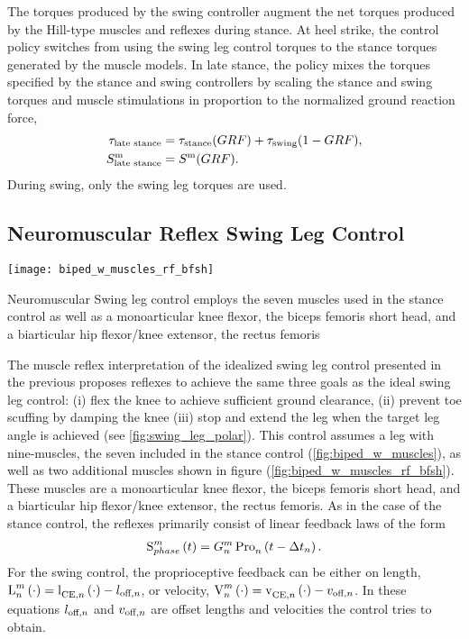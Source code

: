 The torques produced by the swing controller augment the net torques produced by
the Hill-type muscles and reflexes during stance. At heel strike, the control
policy switches from using the swing leg control torques to the stance torques
generated by the muscle models. In late stance, the policy mixes the torques
specified by the stance and swing controllers by scaling the stance and swing
torques and muscle stimulations in proportion to the normalized ground reaction
force,
\begin{align}
    \tau_{\textnormal{late stance}} &= \tau_{\textnormal{stance}}(GRF) +
    \tau_{\textnormal{swing}}(1 - GRF),\\ 
    S^{\textnormal{m}}_\textrm{late stance}  &= S^{\textnormal{m}}(GRF).
\end{align}
During swing, only the swing leg torques are used.

\subsection{Neuromuscular Reflex Swing Leg Control}\label{sec:neuro_muscle_swing}
\begin{marginfigure}
    \centering
    \texttt{[image: biped\_w\_muscles\_rf\_bfsh]}
    \caption{Neuromuscular Swing leg control employs the seven muscles used in
    the stance control as well as a monoarticular knee flexor, the biceps
    femoris short head, and a biarticular hip flexor/knee extensor, the rectus
    femoris} 
    \label{fig:biped_w_muscles_rf_bfsh}
\end{marginfigure} 

The muscle reflex interpretation of the idealized swing leg control presented in
the previous  proposes reflexes to achieve
the same three goals as the ideal swing leg control: (i) flex the knee to
achieve sufficient ground clearance, (ii) prevent toe scuffing by damping the
knee (iii) stop and extend the leg when the target leg angle is achieved (see
\cref{fig:swing_leg_polar}). This control assumes a leg with nine-muscles, the
seven included in the stance control (\cref{fig:biped_w_muscles}), as well as
two additional muscles shown in figure (\cref{fig:biped_w_muscles_rf_bfsh}).
These muscles are a monoarticular knee flexor, the biceps femoris short head,
and a biarticular hip flexor/knee extensor, the rectus femoris. As in the case
of the stance control, the reflexes primarily consist of linear feedback laws of
the form
\begin{align}
    \func{S}[phase][m]{t} = G_n^m \func{Pro}[n][]{t - \Delta t_n}.
\end{align}
For the swing control, the proprioceptive feedback can be either on length,
$\func{L}[n][m]{\cdot} = \func{l}[\tn{CE},n][]{\cdot} - l_{\tn{off}, n}$,
or velocity, $\func{V}[n][m]{\cdot} = \func{v}[\tn{CE},n][]{\cdot} -
v_{\tn{off}, n}$. In these equations $l_{\textnormal{off},n}$ and $v_{\textnormal{off}, n}$ are
offset lengths and velocities the control tries to obtain.

